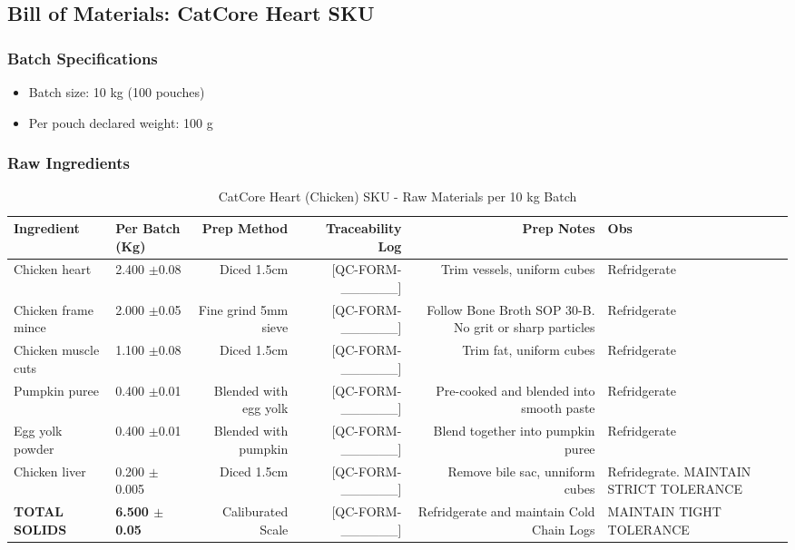 \subsection*{Bill of Materials: CatCore Heart SKU}
\label{bom:catcore_heart}

\subsubsection*{Batch Specifications}
\begin{itemize}
\item Batch size: 10 kg (100 pouches)
\item Per pouch declared weight: 100 g
\end{itemize}

\subsubsection*{Raw Ingredients}
\begin{table}[h]
\centering
\caption{CatCore Heart (Chicken) SKU - Raw Materials per 10 kg Batch}
\begin{tabular}{@{}llrrrp{4cm}@{}}
\toprule
\textbf{Ingredient} & \textbf{Per Batch (Kg)} & \textbf{Prep Method}  & \textbf{Traceability Log} & \textbf{Prep Notes} & Obs\\
\midrule
Chicken heart       & 2.400 $\pm$0.08  & Diced 1.5cm            & [QC-FORM-\_\_\_\_\_\_] & Trim vessels, uniform cubes & Refridgerate\\
Chicken frame mince & 2.000 $\pm$0.05  & Fine grind 5mm sieve   & [QC-FORM-\_\_\_\_\_\_] & Follow Bone Broth SOP 30-B. No grit or sharp particles & Refridgerate  \\
Chicken muscle cuts & 1.100 $\pm$0.08  & Diced 1.5cm            & [QC-FORM-\_\_\_\_\_\_] & Trim fat, uniform cubes  & Refridgerate\\
Pumpkin puree       & 0.400 $\pm$0.01  & Blended with egg yolk  & [QC-FORM-\_\_\_\_\_\_] & Pre-cooked and blended into smooth paste & Refridgerate \\
Egg yolk powder     & 0.400 $\pm$0.01  & Blended with pumpkin   & [QC-FORM-\_\_\_\_\_\_] & Blend together into pumpkin puree  & Refridgerate  \\
Chicken liver       & 0.200 $\pm$0.005 & Diced 1.5cm            & [QC-FORM-\_\_\_\_\_\_] & Remove bile sac, unniform cubes & Refridegrate. MAINTAIN STRICT TOLERANCE \\ 
\midrule
\textbf{TOTAL SOLIDS} & \textbf{6.500 $\pm$0.05} & Caliburated Scale & [QC-FORM-\_\_\_\_\_\_] & Refridgerate and maintain Cold Chain Logs & MAINTAIN TIGHT TOLERANCE \\
\bottomrule
\end{tabular}
\end{table}

